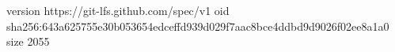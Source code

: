 version https://git-lfs.github.com/spec/v1
oid sha256:643a625755e30b053654edceffd939d029f7aac8bce4ddbd9d9026f02ee8a1a0
size 2055

